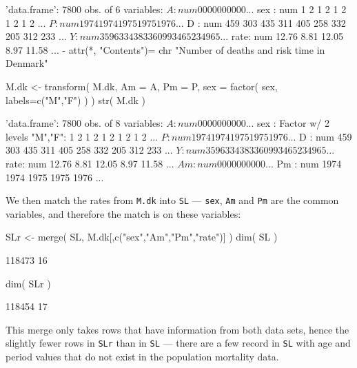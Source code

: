\begin{enumerate}[resume]
\begin{Schunk}
\begin{Soutput}
'data.frame':	7800 obs. of  6 variables:
 $ A   : num  0 0 0 0 0 0 0 0 0 0 ...
 $ sex : num  1 2 1 2 1 2 1 2 1 2 ...
 $ P   : num  1974 1974 1975 1975 1976 ...
 $ D   : num  459 303 435 311 405 258 332 205 312 233 ...
 $ Y   : num  35963 34383 36099 34652 34965 ...
 $ rate: num  12.76 8.81 12.05 8.97 11.58 ...
 - attr(*, "Contents")= chr "Number of deaths and risk time in Denmark"
\end{Soutput}
\begin{Sinput}
 M.dk <- transform( M.dk, Am = A,
                          Pm = P,
                         sex = factor( sex, labels=c("M","F") ) )
 str( M.dk )
\end{Sinput}
\begin{Soutput}
'data.frame':	7800 obs. of  8 variables:
 $ A   : num  0 0 0 0 0 0 0 0 0 0 ...
 $ sex : Factor w/ 2 levels "M","F": 1 2 1 2 1 2 1 2 1 2 ...
 $ P   : num  1974 1974 1975 1975 1976 ...
 $ D   : num  459 303 435 311 405 258 332 205 312 233 ...
 $ Y   : num  35963 34383 36099 34652 34965 ...
 $ rate: num  12.76 8.81 12.05 8.97 11.58 ...
 $ Am  : num  0 0 0 0 0 0 0 0 0 0 ...
 $ Pm  : num  1974 1974 1975 1975 1976 ...
\end{Soutput}
\end{Schunk}
We then match the rates from \texttt{M.dk} into \texttt{SL} ---
\texttt{sex}, \texttt{Am} and \texttt{Pm} are the common variables,
and therefore the match is on these variables:
\begin{Schunk}
\begin{Sinput}
 SLr <- merge( SL, M.dk[,c("sex","Am","Pm","rate")] )
 dim( SL )
\end{Sinput}
\begin{Soutput}
[1] 118473     16
\end{Soutput}
\begin{Sinput}
 dim( SLr )
\end{Sinput}
\begin{Soutput}
[1] 118454     17
\end{Soutput}
\end{Schunk}
This merge only takes rows that have information from both data sets,
hence the slightly fewer rows in \texttt{SLr} than in \texttt{SL} ---
there are a few record in \texttt{SL} with age and period values that
do not exist in the population mortality data.
    

\end{enumerate}
